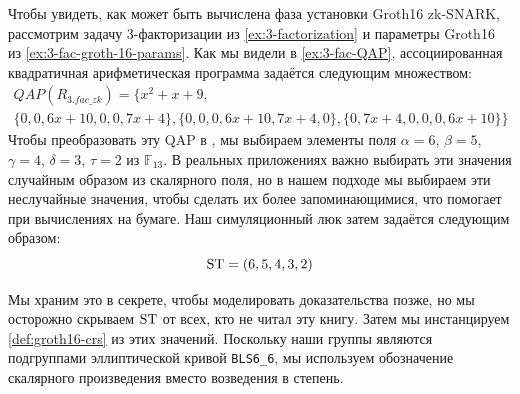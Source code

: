 \begin{example}
\label{ex:3-fac-groth-16-crs}
Чтобы увидеть, как может быть вычислена фаза установки Groth16 zk-SNARK, рассмотрим задачу 3-факторизации из \ref{ex:3-factorization} и параметры Groth16 из \examplename{} \ref{ex:3-fac-groth-16-params}. Как мы видели в \ref{ex:3-fac-QAP}, ассоциированная квадратичная арифметическая программа задаётся следующим множеством:
\begin{multline*}
QAP(R_{3.fac\_zk}) =\{x^{2}+x+9,\\
 \{0,0,6x+10,0,0,7x+4\},\{0,0,0,6x+10,7x+4,0\},\{0,7x+4,0,0,0,6x+10\}\}
\end{multline*}
Чтобы преобразовать эту QAP в , мы выбираем элементы поля $\alpha=6$, $\beta=5$, $\gamma=4$, $\delta=3$, $\tau=2$ из $\mathbb{F}_{13}$.
В реальных приложениях важно выбирать эти значения случайным образом из скалярного поля, но в нашем подходе мы выбираем эти неслучайные значения, чтобы сделать их более запоминающимися, что помогает при вычислениях на бумаге. Наш симуляционный люк затем задаётся следующим образом:
$$
\mathrm{ST} = (6,5,4,3,2)
$$

Мы храним это в секрете, чтобы моделировать доказательства позже, но мы осторожно скрываем $\mathrm{ST}$ от всех, кто не читал эту книгу. Затем мы инстанцируем  \ref{def:groth16-crs} из этих значений. Поскольку наши группы являются подгруппами эллиптической кривой \texttt{BLS6\_6}, мы используем обозначение скалярного произведения вместо возведения в степень.


\end{example}
